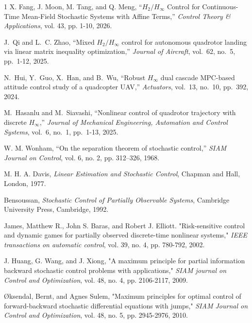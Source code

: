 \documentclass[lettersize,journal]{IEEEtran}
\theoremstyle{plain}
\theoremstyle{definition}
\begin{document}
\begin{thebibliography}{1}
X. Fang, J. Moon, M. Tang, and Q. Meng, ``$H_2/H_\infty$ Control for Continuous-Time Mean-Field Stochastic Systems with Affine Terms,'' \textit{Control Theory \& Applications}, vol. 43, pp. 1-10, 2026.

J.~Qi and L.~C. Zhao, “Mixed $H_2/H_\infty$ control for autonomous quadrotor landing via linear matrix inequality optimization,” \textit{Journal of Aircraft}, vol.~62, no.~5, pp.~1-12, 2025.

N.~Hui, Y.~Guo, X.~Han, and B.~Wu, “Robust $H_\infty$ dual cascade MPC-based attitude control study of a quadcopter UAV,” \textit{Actuators}, vol.~13, no.~10, pp.~392, 2024.

M.~Hasanlu and M.~Siavashi, “Nonlinear control of quadrotor trajectory with discrete $H_\infty$,” \textit{Journal of Mechanical Engineering, Automation and Control Systems}, vol.~6, no.~1, pp.~1-13, 2025.

W. M. Wonham, ``On the separation theorem of stochastic control,'' \textit{SIAM Journal on Control}, vol. 6, no. 2, pp. 312--326, 1968.

M. H. A. Davis, \textit{Linear Estimation and Stochastic Control}, Chapman and Hall, London, 1977.

Bensoussan, \textit{Stochastic Control of Partially Observable Systems}, Cambridge University Press, Cambridge, 1992.

James, Matthew R., John S. Baras, and Robert J. Elliott. "Risk-sensitive control and dynamic games for partially observed discrete-time nonlinear systems," \textit{IEEE transactions on automatic control}, vol. 39, no. 4, pp.  780-792, 2002.

J. Huang, G. Wang, and J. Xiong, "A maximum principle for partial information backward stochastic control problems with applications," \textit{SIAM journal on Control and Optimization}, vol. 48, no. 4, pp. 2106-2117, 2009.

Øksendal, Bernt, and Agnes Sulem, "Maximum principles for optimal control of forward-backward stochastic differential equations with jumps," \textit{SIAM Journal on Control and Optimization}, vol. 48, no. 5, pp. 2945-2976, 2010.


\end{thebibliography}
\end{document}

